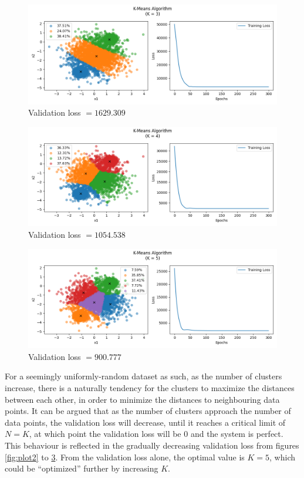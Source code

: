 \documentclass[letterpaper]{article}
\begin{document}
\begin{figure}[H]
	\centering
	\includegraphics[width=\linewidth]{Figure_4}
	\caption{Validation loss $ = 1629.309$}
	\label{fig:plot4}
\end{figure}

\begin{figure}[H]
	\centering
	\includegraphics[width=\linewidth]{Figure_5}
	\caption{Validation loss $ = 1054.538$}
	\label{fig:plot5}
\end{figure}

\begin{figure}[H]
	\centering
	\includegraphics[width=\linewidth]{Figure_6}
	\caption{Validation loss $ = 900.777$}
	\label{fig:plot6}
\end{figure}

\noindent
For a seemingly uniformly-random dataset as such, as the number of clusters increase, there is a naturally tendency for the clusters to maximize the distances between each other, in order to minimize the distances to neighbouring data points. It can be argued that as the number of clusters approach the number of data points, the validation loss will decrease, until it reaches a critical limit of $N = K$, at which point the validation loss will be $0$ and the system is perfect. This behaviour is reflected in the gradually decreasing validation loss from figures \ref{fig:plot2} to \ref{fig:plot6}. From the validation loss alone, the optimal value is $K = 5$, which could be ``optimized'' further by increasing $K$. 
\end{document}
